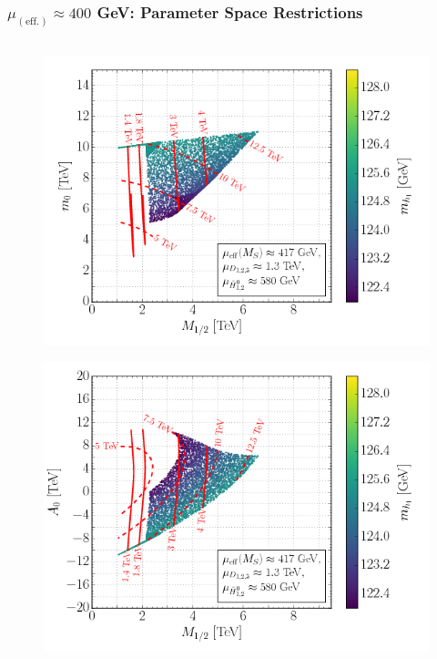 \documentclass[10pt,aspectratio=169]{beamer}
\begin{document}
\begin{frame}
  \frametitle{$\mu_{(\text{eff.})} \approx 400$ GeV: Parameter Space
    Restrictions}
  \begin{columns}[t]
    \begin{column}{0.3\textwidth}
      \vspace{-20pt}
      \begin{figure}
        \includegraphics[width=1.1\textwidth]{cse6ssm_mupos400GeV_m12m0_Mhh}
      \end{figure}
      \vspace{-30pt}
      \begin{figure}
        \includegraphics[width=1.1\textwidth]{cse6ssm_mupos400GeV_m12A0_Mhh}
      \end{figure}

\end{column}
\end{columns}
\end{frame}
\end{document}
